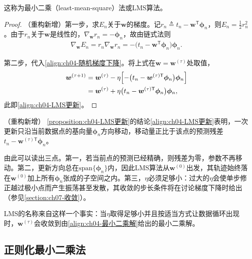 \documentclass[../../main.tex]{subfiles}
\begin{document}
这称为最小二乘（least-mean-square）法或LMS算法。

\begin{proof}
（重构新增）第一步，求$E_n$关于$\boldsymbol{w}$的梯度。记$r_n\triangleq t_n-\boldsymbol{w}^{\mathsf{T}}\boldsymbol{\phi}_n$，则$E_n=\frac{1}{2}r_n^2$。由于$r_n$关于$\boldsymbol{w}$是线性的，$\nabla_{\boldsymbol{w}}r_n=-\boldsymbol{\phi}_n$，故由链式法则
\begin{align*}
  \nabla_{\boldsymbol{w}}E_n=r_n\nabla_{\boldsymbol{w}}r_n=-\bigl(t_n-\boldsymbol{w}^{\mathsf{T}}\boldsymbol{\phi}_n\bigr)\boldsymbol{\phi}_n .
\end{align*}

第二步，代入\eqref{align:ch04-随机梯度下降}。将上式在$\boldsymbol{w}=\boldsymbol{w}^{(\tau)}$处取值，
\begin{align*}
  \boldsymbol{w}^{(\tau+1)}&=\boldsymbol{w}^{(\tau)}-\eta\Bigl[-\bigl(t_n-\boldsymbol{w}^{(\tau)\mathsf{T}}\boldsymbol{\phi}_n\bigr)\boldsymbol{\phi}_n\Bigr]\\
  &=\boldsymbol{w}^{(\tau)}+\eta\bigl(t_n-\boldsymbol{w}^{(\tau)\mathsf{T}}\boldsymbol{\phi}_n\bigr)\boldsymbol{\phi}_n,
\end{align*}
此即\eqref{align:ch04-LMS更新}。
\end{proof}

\begin{remark}（重构新增）
\cref{proposition:ch04-LMS更新}的结论\eqref{align:ch04-LMS更新}表明，一次更新只沿当前数据点的基向量$\boldsymbol{\phi}_n$方向移动，移动量正比于该点的预测残差$t_n-\boldsymbol{w}^{(\tau)\mathsf{T}}\boldsymbol{\phi}_n$。

由此可以读出三点。第一，若当前点的预测已经精确，则残差为零，参数不再移动。第二，更新方向总在$\mathrm{span}\{\boldsymbol{\phi}_n\}$内，因此LMS算法从$\boldsymbol{w}^{(0)}$出发，其轨迹始终落在$\boldsymbol{w}^{(0)}$加上所有$\boldsymbol{\phi}_n$张成的子空间之内。第三，$\eta$必须足够小：过大的$\eta$会使单步修正越过极小点而产生振荡甚至发散，其收敛的步长条件将在讨论梯度下降时给出（参见\cref{section:ch07-收敛}）。

LMS的名称来自这样一个事实：当$\eta$取得足够小并且按适当方式让数据循环出现时，$\boldsymbol{w}^{(\tau)}$会收敛到由\eqref{align:ch04-最小二乘解}给出的最小二乘解。
\end{remark}

\subsection{正则化最小二乘法}\label{subsection:ch04-正则化最小二乘}
\end{document}

